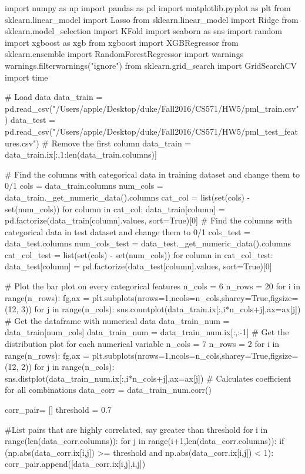 \documentclass[12pt]{article}
\begin{document}
\begin{python}
import numpy as np
import pandas as pd
import matplotlib.pyplot as plt
from sklearn.linear_model import Lasso
from sklearn.linear_model import Ridge
from sklearn.model_selection import KFold
import seaborn as sns
import random
import xgboost as xgb
from xgboost import XGBRegressor
from sklearn.ensemble import RandomForestRegressor
import warnings
warnings.filterwarnings("ignore")
from sklearn.grid_search import GridSearchCV
import time

# Load data
data_train = pd.read_csv("/Users/apple/Desktop/duke/Fall2016/CS571/HW5/pml_train.csv")
data_test = pd.read_csv("/Users/apple/Desktop/duke/Fall2016/CS571/HW5/pml_test_features.csv")
# Remove the first column
data_train = data_train.ix[:,1:len(data_train.columns)]

# Find the columns with categorical data in training dataset and change them to 0/1
cols = data_train.columns
num_cols = data_train._get_numeric_data().columns
cat_col = list(set(cols) - set(num_cols))
for column in cat_col:
    data_train[column] = pd.factorize(data_train[column].values, sort=True)[0]
# Find the columns with categorical data in test dataset and change them to 0/1
cols_test = data_test.columns
num_cols_test = data_test._get_numeric_data().columns
cat_col_test = list(set(cols) - set(num_cols))
for column in cat_col_test:
    data_test[column] = pd.factorize(data_test[column].values, sort=True)[0]

# Plot the bar plot on every categorical features
n_cols = 6
n_rows = 20
for i in range(n_rows):
    fg,ax = plt.subplots(nrows=1,ncols=n_cols,sharey=True,figsize=(12, 3))
    for j in range(n_cols):
        sns.countplot(data_train.ix[:,i*n_cols+j],ax=ax[j])
# Get the dataframe with numerical data
data_train_num = data_train[num_cols]
data_train_num = data_train_num.ix[:,:-1]
# Get the distribution plot for each numerical variable
n_cols = 7
n_rows = 2
for i in range(n_rows):
    fg,ax = plt.subplots(nrows=1,ncols=n_cols,sharey=True,figsize=(12, 2))
    for j in range(n_cols):
        sns.distplot(data_train_num.ix[:,i*n_cols+j],ax=ax[j])
# Calculates  coefficient for all combinations
data_corr = data_train_num.corr()

corr_pair= []
threshold = 0.7

#List pairs that are highly correlated, say greater than threshold
for i in range(len(data_corr.columns)): 
    for j in range(i+1,len(data_corr.columns)): 
        if (np.abs(data_corr.ix[i,j]) >= threshold and np.abs(data_corr.ix[i,j]) < 1):
            corr_pair.append([data_corr.ix[i,j],i,j]) 


\end{python}
\end{document}
